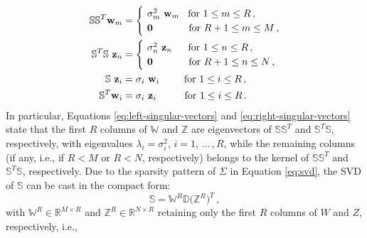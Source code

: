 \documentclass[12pt, a4paper, twoside, openright]{report}
\numberwithin{equation}{chapter}
\theoremstyle{theorem}
\theoremstyle{definition}
\theoremstyle{remark}
\theoremstyle{proposition}
\numberwithin{figure}{chapter}
\begin{document}
		\begin{align}
			\label{eq:left-singular-vectors}
			\mathbb{S} \mathbb{S}^T \mathbf{w}_m & = 
			\begin{cases}
				& \hspace*{-0.3cm} \sigma_m^2 ~ \mathbf{w}_m \hspace*{0.3cm} \text{for $1 \leq m \leq R$} \, , \\
				& \hspace*{-0.3cm} \mathbf{0} \hspace*{1.27cm} \text{for $R+1 \leq m \leq M$} \, ,
			\end{cases} \\
			\label{eq:right-singular-vectors}
			\mathbb{S}^T \mathbb{S} ~ \mathbf{z}_n & =
			\begin{cases}
				& \hspace*{-0.3cm} \sigma_n^2 ~ \mathbf{z}_n \hspace*{0.57cm} \text{for $1 \leq n \leq R$} \, , \\
				& \hspace*{-0.3cm} \mathbf{0} \hspace*{1.27cm} \text{for $R+1 \leq n \leq N$} \, ,
			\end{cases} \\
			\label{eq:snapshot-method}
			\mathbb{S} ~ \mathbf{z}_i & = \sigma_i ~ \mathbf{w}_i \hspace*{0.87cm} \text{for $1 \leq i \leq R$} \, , \\
			\mathbb{S}^T \mathbf{w}_i & = \sigma_i ~ \mathbf{z}_i \hspace*{1cm} \text{for $1 \leq i \leq R$} \, .
		\end{align}
		In particular, Equations \eqref{eq:left-singular-vectors} and \eqref{eq:right-singular-vectors} state that the first $R$ columns of $\mathbb{W}$ and $\mathbb{Z}$ are eigenvectors of $\mathbb{S} \mathbb{S}^T$ and $\mathbb{S}^T \mathbb{S}$, respectively, with eigenvalues $\lambda_i = \sigma_i^2$, $i = 1, \, \ldots \, , R$, while the remaining columns (if any, i.e., if $R < M$ or $R < N$, respectively) belongs to the kernel of $\mathbb{S} \mathbb{S}^T$ and $\mathbb{S}^T \mathbb{S}$, respectively. Due to the sparsity pattern of $\Sigma$ in Equation \eqref{eq:svd}, the SVD of $\mathbb{S}$ can be cast in the compact form:
		\begin{equation}
			\label{eq:svd-compact}
			\mathbb{S} = \mathbb{W}^R \mathbb{D} \big( \mathbb{Z}^R \big) ^T \, ,
		\end{equation}
		with $\mathbb{W}^R \in \mathbb{R}^{M \times R}$ and $\mathbb{Z}^R \in \mathbb{R}^{N \times R}$ retaining only the first $R$ columns of $W$ and $Z$, respectively, i.e.,
\end{document}
